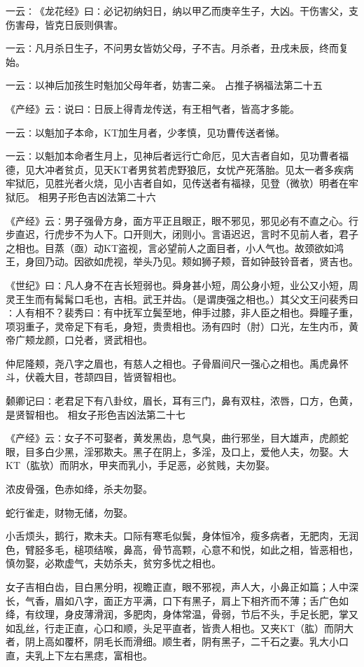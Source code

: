 \documentclass[a4paper,12pt,UTF8,twoside]{ctexbook}
\begin{document}
一云∶《龙花经》曰∶必记初纳妇日，纳以甲乙而庚辛生子，大凶。干伤害父，支伤害母，皆克日辰则俱害。

一云∶凡月杀日生子，不问男女皆妨父母，子不吉。月杀者，丑戌未辰，终而复始。

一云∶以神后加孩生时魁加父母年者，妨害二亲。
占推子祸福法第二十五

《产经》云∶说曰∶日辰上得青龙传送，有王相气者，皆高才多能。

一云∶以魁加子本命，KT加生月者，少孝慎，见功曹传送者悌。

一云∶以魁加本命者生月上，见神后者远行亡命厄，见大吉者自如，见功曹者福德，见大冲者贫贞，见天KT者男贫若虎野狼厄，女忧产死落胎。见太一者多疾病牢狱厄，见胜光者火烧，见小吉者自如，见传送者有福禄，见登（微欤）明者在牢狱厄。
相男子形色吉凶法第二十六

《产经》云∶男子强骨方身，面方平正且眼正，眼不邪见，邪见必有不直之心。行步直迟，行虎步不为人下。口开则大，闭则小。言语迟迟，言时不见前人者，君子之相也。目蒸（亟）动KT盗视，言必望前人之面目者，小人气也。故颈欲如鸿王，身回乃动。因欲如虎视，举头乃见。颊如狮子颊，音如钟鼓铃音者，贤吉也。

《世纪》曰∶凡人身不在吉长短弱也。舜身甚小短，周公身小短，业公又小短，周灵王生而有髯髯口毛也，吉相。武王并齿。（是谓庚强之相也。）其父文王问裴秀曰∶人有相不？裴秀曰∶有中抚军立鬓至地，伸手过膝，非人臣之相也。舜瞳子重，项羽重子，灵帝足下有毛，身短，贵贵相也。汤有四时（肘）口光，左生内币，黄帝广颊龙颜，口兑者，贤武相也。

仲尼隆颊，尧八字之眉也，有慈人之相也。子骨眉间尺一强心之相也。禹虎鼻怀斗，伏羲大目，苍颉四目，皆贤智相也。

颡卿记曰∶老君足下有八卦纹，眉长，耳有三门，鼻有双柱，浓唇，口方，色黄，是贤智相也。
相女子形色吉凶法第二十七

《产经》云∶女子不可娶者，黄发黑齿，息气臭，曲行邪坐，目大雄声，虎颜蛇眼，目多白少黑，淫邪欺夫。黑子在阴上，多淫，及口上，爱他人夫，勿娶。大KT（肱欤）而阴水，甲夹而乳小，手足恶，必贫贱，夫勿娶。

浓皮骨强，色赤如绛，杀夫勿娶。

蛇行雀走，财物无储，勿娶。

小舌烦头，鹅行，欺未夫。口际有寒毛似鬓，身体恒冷，瘦多病者，无肥肉，无润色，臂胫多毛，槌项结喉，鼻高，骨节高颗，心意不和悦，如此之相，皆恶相也，慎勿娶，必欺虚气，夫妨杀夫，贫穷多忧之相也。

女子吉相白齿，目白黑分明，视瞻正直，眼不邪视，声人大，小鼻正如篇；人中深长，气香，眉如八字，面正方平满，口下有黑子，肩上下相齐而不薄；舌广色如绛，有纹理，身皮薄滑润，多肥肉，身体常温，骨弱，节后不头，手足长肥，掌又如乱丝，行走正直，心口和顺，头足平直者，皆贵人相也。又夹KT（肱）而阴大者，阴上高如覆杯，阴毛长而滑细。顺生者，阴有黑子，二千石之妻。乳大小口直，夫乳上下左右黑痣，富相也。
\end{document}
